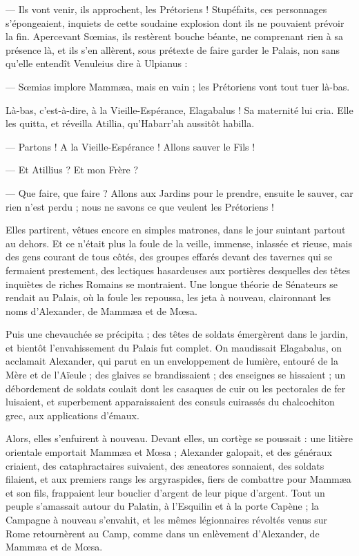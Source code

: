 \documentclass[a4paper, 11pt, oneside, polutonikogreek, french]{article}
\begin{document}
--- Ils vont venir, ils approchent, les Prétoriens ! Stupéfaits, ces personnages s'épongeaient, inquiets de cette soudaine explosion dont ils ne pouvaient prévoir la fin. Apercevant Sœmias, ils restèrent bouche béante, ne comprenant rien à sa présence là, et ils s'en allèrent, sous prétexte de faire garder le Palais, non sans qu'elle entendît Venuleius dire à Ulpianus :

--- Sœmias implore Mammæa, mais en vain ; les Prétoriens vont tout tuer là-bas.

Là-bas, c'est-à-dire, à la Vieille-Espérance, Elagabalus ! Sa maternité lui cria. Elle les quitta, et réveilla Atillia, qu'Habarr'ah aussitôt habilla.

--- Partons ! A la Vieille-Espérance ! Allons sauver le Fils !

--- Et Atillius ? Et mon Frère ?

--- Que faire, que faire ? Allons aux Jardins pour le prendre, ensuite le sauver, car rien n'est perdu ; nous ne savons ce que veulent les Prétoriens !

Elles partirent, vêtues encore en simples matrones, dans le jour suintant partout au dehors. Et ce n'était plus la foule de la veille, immense, inlassée et rieuse, mais des gens courant de tous côtés, des groupes effarés devant des tavernes qui se fermaient prestement, des lectiques hasardeuses aux portières desquelles des têtes inquiètes de riches Romains se montraient. Une longue théorie de Sénateurs se rendait au Palais, où la foule les repoussa, les jeta à nouveau, claironnant les noms d'Alexander, de Mammæa et de Mœsa.

Puis une chevauchée se précipita ; des têtes de soldats émergèrent dans le jardin, et bientôt l'envahissement du Palais fut complet. On maudissait Elagabalus, on acclamait Alexander, qui parut en un enveloppement de lumière, entouré de la Mère et de l'Aïeule ; des glaives se brandissaient ; des enseignes se hissaient ; un débordement de soldats coulait dont les casaques de cuir ou les pectorales de fer luisaient, et superbement apparaissaient des consuls cuirassés du chalcochiton grec, aux applications d'émaux.

Alors, elles s'enfuirent à nouveau. Devant elles, un cortège se poussait : une litière orientale emportait Mammæa et Mœsa ; Alexander galopait, et des généraux criaient, des cataphractaires suivaient, des æneatores sonnaient, des soldats filaient, et aux premiers rangs les argyraspides, fiers de combattre pour Mammæa et son fils, frappaient leur bouclier d'argent de leur pique d'argent. Tout un peuple s'amassait autour du Palatin, à l'Esquilin et à la porte Capène ; la Campagne à nouveau s'envahit, et les mêmes légionnaires révoltés venus sur Rome retournèrent au Camp, comme dans un enlèvement d'Alexander, de Mammæa et de Mœsa.
\end{document}
